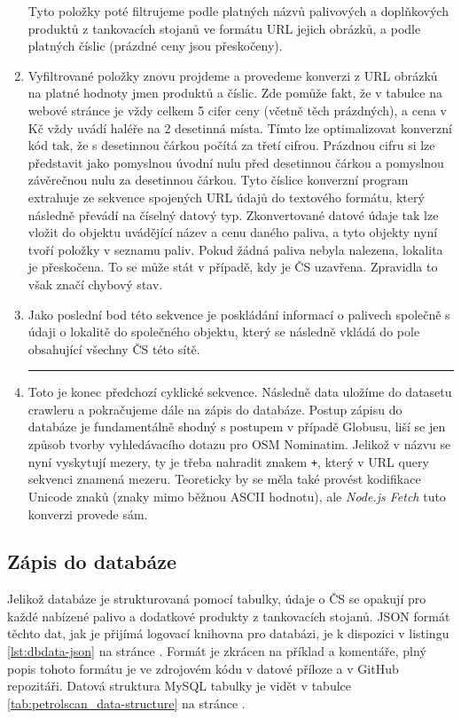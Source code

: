 \begin{enumerate}
        Tyto položky poté filtrujeme podle platných názvů palivových a doplňkových
        produktů z tankovacích stojanů ve formátu URL jejich obrázků, a podle platných
        číslic (prázdné ceny jsou přeskočeny).
    \item Vyfiltrované položky znovu projdeme a provedeme konverzi z URL obrázků
        na platné hodnoty jmen produktů a číslic. Zde pomůže fakt, že v tabulce
        na webové stránce je vždy celkem 5 cifer ceny (včetně těch prázdných), a cena
        v Kč vždy uvádí haléře na 2 desetinná místa. Tímto lze optimalizovat konverzní
        kód tak, že s desetinnou čárkou počítá za třetí cifrou. Prázdnou cifru si lze představit jako pomyslnou úvodní nulu před desetinnou čárkou a pomyslnou závěrečnou
        nulu za desetinnou čárkou. Tyto číslice konverzní program extrahuje ze sekvence
        spojených URL údajů do textového formátu, který následně převádí na číselný datový
        typ. Zkonvertované datové údaje tak lze vložit do objektu uvádějící název a cenu
        daného paliva, a tyto objekty nyní tvoří položky v seznamu paliv. Pokud žádná
        paliva nebyla nalezena, lokalita je přeskočena. To se může stát v případě, kdy
        je ČS uzavřena. Zpravidla to však značí chybový stav.
    \item Jako poslední bod této sekvence je poskládání informací o palivech společně
        s údaji o lokalitě do společného objektu, který se následně vkládá do pole
        obsahující všechny ČS této sítě.
        \hrule
    \item Toto je konec předchozí cyklické sekvence. Následně data uložíme do datasetu
        crawleru a pokračujeme dále na zápis do databáze. Postup zápisu do databáze
        je fundamentálně shodný s postupem v případě Globusu, liší se jen způsob tvorby
        vyhledávacího dotazu pro OSM Nominatim. Jelikož v názvu se nyní vyskytují mezery,
        ty je třeba nahradit znakem \texttt{+}, který v URL query sekvenci znamená mezeru.
        Teoreticky by se měla také provést kodifikace Unicode znaků (znaky mimo běžnou ASCII
        hodnotu), ale \emph{Node.js Fetch} tuto konverzi provede sám.
\end{enumerate}

\subsection{Zápis do databáze}

Jelikož databáze je strukturovaná pomocí tabulky, údaje o ČS se opakují pro každé
nabízené palivo a dodatkové produkty z tankovacích stojanů. JSON formát těchto dat,
jak je přijímá logovací knihovna pro databázi, je k dispozici v listingu
\ref{lst:dbdata-json} na stránce \pageref{lst:dbdata-json}. Formát je zkrácen
na příklad a komentáře, plný popis tohoto formátu je ve zdrojovém kódu v datové příloze
a v GitHub repozitáři. Datová struktura MySQL tabulky je vidět v tabulce
\ref{tab:petrolscan_data-structure} na stránce \pageref{tab:petrolscan_data-structure}.

